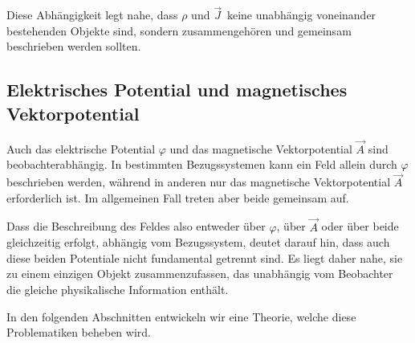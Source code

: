 Diese Abhängigkeit legt nahe, dass \( \rho \) und \( \vec{J}\, \) keine unabhängig voneinander bestehenden Objekte sind, sondern zusammengehören und gemeinsam beschrieben werden sollten.

\subsection{Elektrisches Potential und magnetisches Vektorpotential}
\label{maxwell:gedankenexperiment:potentiale}

Auch das elektrische Potential \( \varphi \) und das magnetische Vektorpotential \( \vec{A} \) sind beobachterabhängig.
In bestimmten Bezugssystemen kann ein Feld allein durch \( \varphi \) beschrieben werden, während in anderen nur das magnetische Vektorpotential \( \vec{A} \) erforderlich ist. Im allgemeinen Fall treten aber beide gemeinsam auf.

Dass die Beschreibung des Feldes also entweder über \( \varphi \), über \( \vec{A} \) oder über beide gleichzeitig erfolgt, abhängig vom Bezugssystem, deutet darauf hin, dass auch diese beiden Potentiale nicht fundamental getrennt sind.
Es liegt daher nahe, sie zu einem einzigen Objekt zusammenzufassen, das unabhängig vom Beobachter die gleiche physikalische Information enthält.

In den folgenden Abschnitten entwickeln wir eine Theorie, welche diese Problematiken beheben wird.




